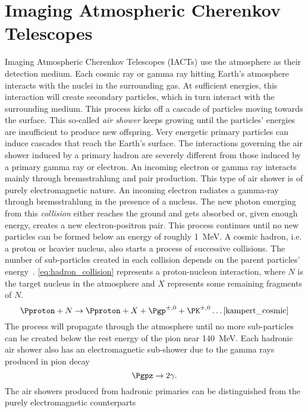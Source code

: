 \section{Imaging Atmospheric Cherenkov Telescopes}
\label{sec:iact}
Imaging Atmospheric Cherenkov Telescopes (IACTs) use the atmosphere as their detection medium. 
Each cosmic ray or gamma ray hitting Earth's atmosphere interacts with the nuclei in the surrounding 
gas. At sufficient energies, this interaction will create secondary particles, which in turn interact
with the surrounding medium. 
This process kicks off a cascade of particles moving towards the surface. 
This so-called \emph{air shower} keeps growing until the particles' energies are insufficient to produce new 
offspring. Very energetic primary particles can induce cascades that reach the Earth's surface. 
The interactions governing the air shower induced by a primary hadron are severely different from 
those induced by a primary gamma ray or electron.
An incoming electron or gamma ray interacts mainly through bremsstrahlung and pair production. 
This type of air shower is of purely electromagnetic nature. An incoming electron radiates a 
gamma-ray through bremsstrahlung in the presence of a nucleus. The new photon emerging from this 
\emph{collision} either reaches the ground and gets absorbed or, given enough energy, 
creates a new electron-positron pair. 
This process continues until no new particles can be formed below an energy of roughly \SI{1}{MeV}.
A cosmic hadron, i.e. a proton or heavier nucleus, also starts a process of successive collisions. 
The number of sub-particles created in each collision depends on the parent particles' energy~\cite[78]{grieder_air_shower}. 
\autoref{eq:hadron_collision} represents a proton-nucleon interaction, where $N$ is the target nucleus in the atmosphere
and $X$ represents some remaining fragments of $N$. 
\begin{equation}
  \label{eq:hadron_collision}
  \Pproton + N \rightarrow \Pproton + X + \Pgp^{\pm,0} + \PK^{\pm,0}\ldots\text{\cite{kampert_cosmic}}
\end{equation}
The process will propagate through the atmosphere until no more sub-particles can be created below the rest energy of the pion 
near \SI{140}{MeV}.
Each hadronic air shower also has an electromagnetic sub-shower due to the gamma rays produced in pion decay
\begin{equation}
  \label{eq:pion_decay}
  \Pgpz \rightarrow 2 \gamma.
\end{equation}
The air showers produced from hadronic primaries can be distinguished from the purely electromagnetic counterparts 

